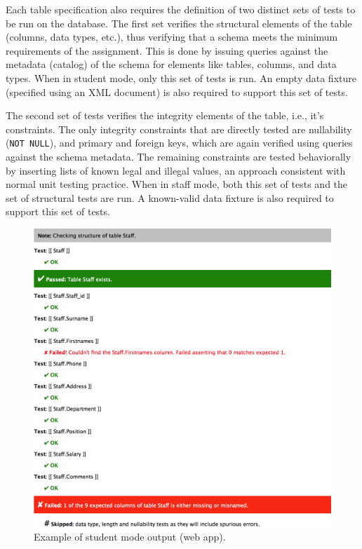 \documentclass[sigconf, authordraft, capitalise]{acmart}
\begin{document}
Each table specification also requires the definition of two distinct sets of tests to be run on the database. The first set verifies the structural elements of the table (columns, data types, etc.), thus verifying that a schema meets the minimum requirements of the assignment. This is done by issuing queries against the metadata (catalog) of the schema for elements like tables, columns, and data types. When in student mode, only this set of tests is run. An empty data fixture (specified using an XML document) is also required to support this set of tests.

The second set of tests verifies the integrity elements of the table, i.e., it's constraints. The only integrity constraints that are directly tested are nullability (\texttt{NOT NULL}), and primary and foreign keys, which are again verified using queries against the schema metadata. The remaining constraints are tested behaviorally by inserting lists of known legal and illegal values, an approach consistent with normal unit testing practice. When in staff mode, both this set of tests and the set of structural tests are run. A known-valid data fixture is also required to support this set of tests.


\begin{figure}
    \includegraphics[width=0.95\columnwidth,keepaspectratio]{images/web_output.png}
    \caption{Example of student mode output (web app).}
    \label{fig-student-output}
\end{figure}
\end{document}
